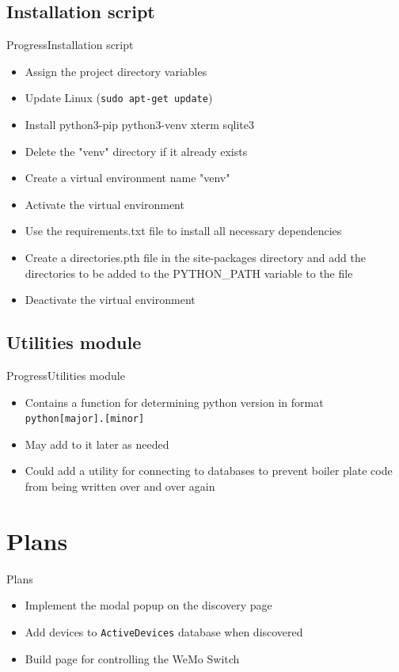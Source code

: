 \subsection{Installation script}
\begin{frame}{Progress}{Installation script}
\begin{itemize}
	\item Assign the project directory variables
	\item Update Linux (\texttt{sudo apt-get update})
	\item Install python3-pip python3-venv xterm sqlite3	
	\item Delete the "venv" directory if it already exists
	\item Create a virtual environment name "venv"
	\item Activate the virtual environment
	\item Use the requirements.txt file to install all necessary dependencies
	\item Create a directories.pth file in the site-packages directory and add the directories to be added to the PYTHON\_PATH variable to the file
	\item Deactivate the virtual environment
\end{itemize}
\end{frame}

\subsection{Utilities module}
\begin{frame}{Progress}{Utilities module}
\begin{itemize}
	\item Contains a function for determining python version in format \texttt{python[major].[minor]}
	\item May add to it later as needed
	\item Could add a utility for connecting to databases to prevent boiler plate code from being written over and over again
\end{itemize}
\end{frame}

\section{Plans}
\begin{frame}{Plans}{}
\begin{itemize}
\item Implement the modal popup on the discovery page
\item Add devices to \texttt{ActiveDevices} database when discovered
\item Build page for controlling the WeMo Switch
\end{itemize}
\end{frame}



